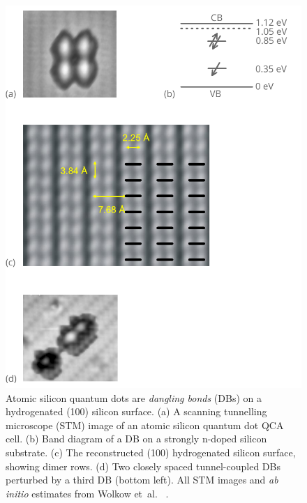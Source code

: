 \begin{figure}
  \center
  \includegraphics{silicon}
  \caption{
Atomic silicon quantum dots are \emph{dangling bonds} (DBs) on a hydrogenated
(100) silicon surface. (a) A scanning tunnelling microscope (STM) image of an
atomic silicon quantum dot QCA cell. (b) Band diagram of a DB on a strongly
n-doped silicon substrate. (c) The reconstructed (100) hydrogenated silicon
surface, showing dimer rows. (d) Two closely spaced tunnel-coupled DBs perturbed
by a third DB (bottom left). All STM images and \emph{ab initio} estimates from
Wolkow et~al.\ \cite{wolkow2013silicon} \cite{pitters2011tunnel}.
}
  \label{fig:silicon}
\end{figure}

